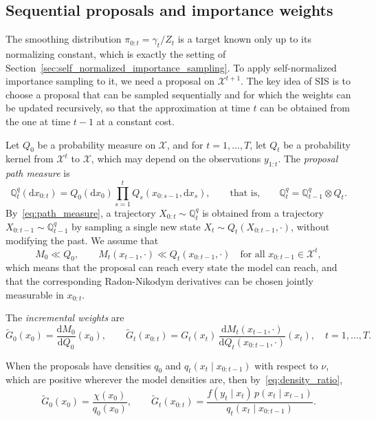 \subsection{Sequential proposals and importance weights}
\label{sec:sis_weights}
The smoothing distribution $\pi_{0:t} = \gamma_t/Z_t$ is a target known only up to its normalizing constant, which is exactly the setting of Section~\ref{sec:self_normalized_importance_sampling}. To apply self-normalized importance sampling to it, we need a proposal on $\mathcal{X}^{t+1}$. The key idea of SIS is to choose a proposal that can be sampled sequentially and for which the weights can be updated recursively, so that the approximation at time $t$ can be obtained from the one at time $t-1$ at a constant cost.

Let $Q_0$ be a probability measure on $\mathcal{X}$, and for $t=1,\ldots,T$, let $Q_t$ be a probability kernel from $\mathcal{X}^{t}$ to $\mathcal{X}$, which may depend on the observations $y_{1:t}$. The \emph{proposal path measure} is
\begin{equation}
    \mathbb{Q}^q_t(\mathrm{d}x_{0:t}) = Q_0(\mathrm{d}x_0)\prod_{s=1}^{t}Q_s(x_{0:s-1},\mathrm{d}x_s), \qquad\text{that is,}\qquad \mathbb{Q}^q_t = \mathbb{Q}^q_{t-1}\otimes Q_t.
\end{equation}
By~\eqref{eq:path_measure}, a trajectory $X_{0:t}\sim\mathbb{Q}^q_t$ is obtained from a trajectory $X_{0:t-1}\sim\mathbb{Q}^q_{t-1}$ by sampling a single new state $X_t\sim Q_t(X_{0:t-1},\cdot)$, without modifying the past. We assume that
\begin{equation}
    M_0\ll Q_0, \qquad M_t(x_{t-1},\cdot)\ll Q_t(x_{0:t-1},\cdot)\quad\text{for all }x_{0:t-1}\in\mathcal{X}^{t},
\end{equation}
which means that the proposal can reach every state the model can reach, and that the corresponding Radon-Nikodym derivatives can be chosen jointly measurable in $x_{0:t}$.

\begin{definition}
    \label{def:incremental_weights}
    The \emph{incremental weights} are
    \begin{equation}
        \tilde{G}_0(x_0) = \frac{\mathrm{d}M_0}{\mathrm{d}Q_0}(x_0), \qquad
        \tilde{G}_t(x_{0:t}) = G_t(x_t)\,\frac{\mathrm{d}M_t(x_{t-1},\cdot)}{\mathrm{d}Q_t(x_{0:t-1},\cdot)}(x_t), \quad t=1,\ldots,T.
    \end{equation}
\end{definition}

When the proposals have densities $q_0$ and $q_t(x_t\mid x_{0:t-1})$ with respect to $\nu$, which are positive wherever the model densities are, then by~\eqref{eq:density_ratio},
\begin{equation}
    \tilde{G}_0(x_0) = \frac{\chi(x_0)}{q_0(x_0)}, \qquad
    \tilde{G}_t(x_{0:t}) = \frac{f(y_t\mid x_t)\,p(x_t\mid x_{t-1})}{q_t(x_t\mid x_{0:t-1})}.
\end{equation}

